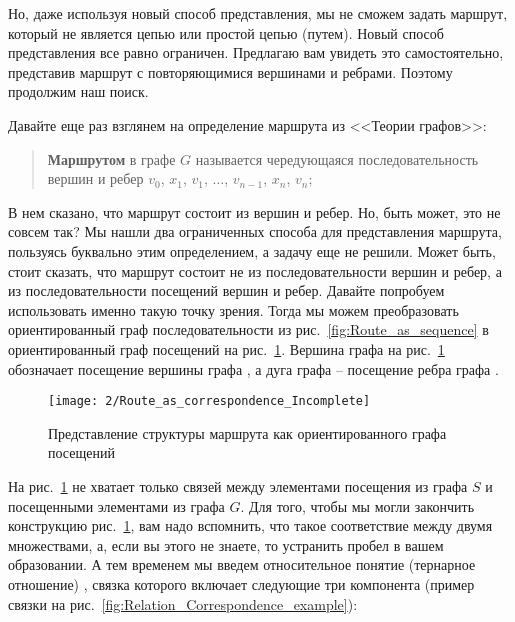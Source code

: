 Но, даже используя новый способ представления, мы не сможем задать
маршрут, который не является цепью или простой цепью (путем). Новый
способ представления все равно ограничен. Предлагаю вам увидеть это
самостоятельно, представив маршрут с повторяющимися вершинами и
ребрами. Поэтому продолжим наш поиск.

Давайте еще раз взглянем на определение маршрута из <<Теории графов>>:

\begin{quotation}
  \textbf{Маршрутом} в графе $G$ называется чередующаяся
  последовательность вершин и ребер $v_0$, $x_1$, $v_1$, $\dotsc$, $v_{n-1}$,
  $x_n$, $v_n$;
\end{quotation}

В нем сказано, что маршрут состоит из вершин и ребер. Но, быть может,
это не совсем так? Мы нашли два ограниченных способа для представления
маршрута, пользуясь буквально этим определением, а задачу еще не
решили. Может быть, стоит сказать, что маршрут состоит не из
последовательности вершин и ребер, а из последовательности посещений
вершин и ребер. Давайте попробуем использовать именно такую точку
зрения. Тогда мы можем преобразовать ориентированный граф
последовательности  из рис.~\ref{fig:Route_as_sequence} в
ориентированный граф посещений  на
рис.~\ref{fig:Route_as_correspondence_Incomplete}. Вершина графа
 на рис.~\ref{fig:Route_as_correspondence_Incomplete}
обозначает посещение вершины графа , а дуга графа  –
посещение ребра графа .

\begin{figure}[h!]
  \centering
  \texttt{[image: 2/Route\_as\_correspondence\_Incomplete]}
  \caption{Представление структуры  маршрута  как
    ориентированного графа посещений}
  \label{fig:Route_as_correspondence_Incomplete}
\end{figure}

На рис.~\ref{fig:Route_as_correspondence_Incomplete} не хватает только
связей между элементами посещения из графа $S$ и посещенными
элементами из графа $G$. Для того, чтобы мы могли закончить
конструкцию рис.~\ref{fig:Route_as_correspondence_Incomplete}, вам
надо вспомнить, что такое соответствие между двумя множествами, а,
если вы этого не знаете, то устранить пробел в вашем образовании. А
тем временем мы введем относительное понятие (тернарное отношение)
, связка которого включает следующие три
компонента (пример связки на
рис.~\ref{fig:Relation_Correspondence_example}):


